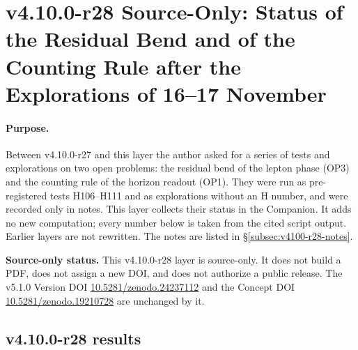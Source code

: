\clearpage
\section*{v4.10.0-r28 Source-Only: Status of the Residual Bend and of the Counting Rule after the Explorations of 16--17 November}
\label{sec:v4100-r28-bend-counting-status}

\paragraph{Purpose.}
Between v4.10.0-r27 and this layer the author asked for a series of tests and explorations on two open problems: the residual bend of the
lepton phase (OP3) and the counting rule of the horizon readout (OP1).  They were run as pre-registered tests H106--H111 and as explorations
without an H number, and were recorded only in notes.  This layer collects their status in the Companion.  It adds no new computation; every
number below is taken from the cited script output.  Earlier layers are not rewritten.  The notes are listed in
\S\ref{subsec:v4100-r28-notes}.

\noindent\textbf{Source-only status.}
This v4.10.0-r28 layer is source-only.  It does not build a PDF, does not assign a new DOI,
and does not authorize a public release.  The v5.1.0 Version DOI
\href{https://doi.org/10.5281/zenodo.24237112}{10.5281/zenodo.24237112} and the Concept DOI
\href{https://doi.org/10.5281/zenodo.19210728}{10.5281/zenodo.19210728} are unchanged by it.

\subsection*{v4.10.0-r28 results}
\label{subsec:v4100-r28-results}

